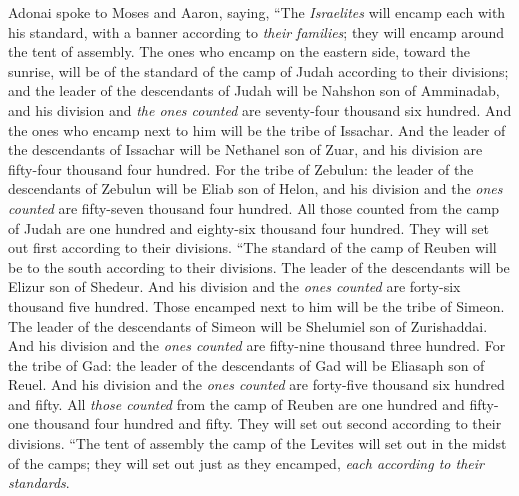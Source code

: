 \begin{biblechapter} %
 Adonai spoke to Moses and Aaron, saying,
\verse “The \textit{Israelites} will encamp each with his standard, with a banner according to \textit{their families}; they will encamp around the tent of assembly.
\verse The ones who encamp on the eastern side, toward the sunrise, will be of the standard of the camp of Judah according to their divisions; and the leader of the descendants of Judah will be Nahshon son of Amminadab,
\verse and his division and \textit{the ones counted} are seventy-four thousand six hundred.
\verse And the ones who encamp next to him will be the tribe of Issachar. And the leader of the descendants of Issachar will be Nethanel son of Zuar,
\verse and his division are fifty-four thousand four hundred.
\verse For the tribe of Zebulun: the leader of the descendants of Zebulun will be Eliab son of Helon,
\verse and his division and the \textit{ones counted} are fifty-seven thousand four hundred.
\verse All those counted from the camp of Judah are one hundred and eighty-six thousand four hundred. They will set out first according to their divisions.
\verse “The standard of the camp of Reuben will be to the south according to their divisions. The leader of the descendants will be Elizur son of Shedeur.
\verse And his division and the \textit{ones counted} are forty-six thousand five hundred.
\verse Those encamped next to him will be the tribe of Simeon. The leader of the descendants of Simeon will be Shelumiel son of Zurishaddai.
\verse And his division and the \textit{ones counted} are fifty-nine thousand three hundred.
\verse For the tribe of Gad: the leader of the descendants of Gad will be Eliasaph son of Reuel.
\verse And his division and the \textit{ones counted} are forty-five thousand six hundred and fifty.
\verse All \textit{those counted} from the camp of Reuben are one hundred and fifty-one thousand four hundred and fifty. They will set out second according to their divisions.
\verse “The tent of assembly the camp of the Levites will set out in the midst of the camps; they will set out just as they encamped, \textit{each according to their standards}.

\end{biblechapter}
